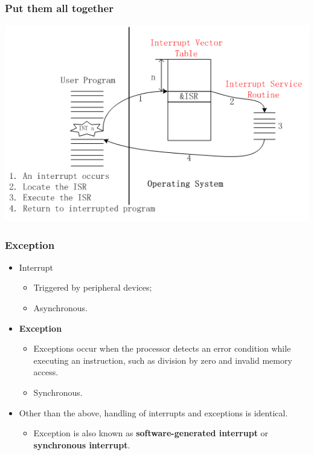 \documentclass[CJKutf8,xcolor=pdftex,dvipsnames,table]{beamer}
\begin{document}
\begin{CJK*}{UTF8}{song}
  \begin{frame}
    \frametitle{Put them all together} \pause
    \begin{center}
      \includegraphics[scale=0.5]{isr}
    \end{center}
  \end{frame}

  \begin{frame}
    \frametitle{Exception} \pause
    \begin{itemize}
    \item{Interrupt} \pause
      \begin{itemize}
      \item{Triggered by peripheral devices;} \pause
      \item{Asynchronous.} \pause
      \end{itemize}
    \item{\textbf{Exception}} \pause
      \begin{itemize}
      \item{Exceptions occur when the processor detects an error condition while executing an instruction, such as division by zero and invalid memory access.} \pause
      \item{Synchronous.} \pause
      \end{itemize}
    \item{Other than the above, handling of interrupts and exceptions is identical.} \pause
      \begin{itemize}
      \item{Exception is also known as \textbf{software-generated interrupt}
        or \textbf{synchronous interrupt}.}
      \end{itemize}
    \end{itemize}
  \end{frame}


\end{CJK*}
\end{document}
